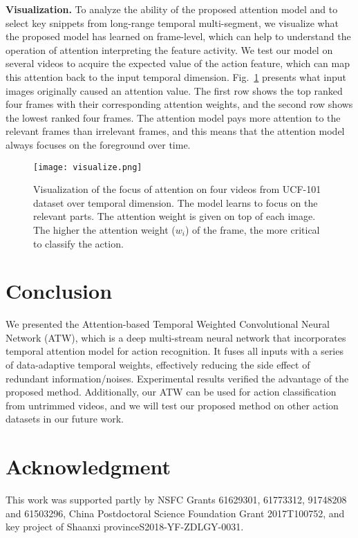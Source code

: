 \documentclass[runningheads,a4paper]{llncs}
\begin{document}
\noindent \textbf{Visualization.} To analyze the ability of the proposed attention model and to select key snippets from long-range temporal multi-segment, we visualize what the proposed model has learned on frame-level, which can help to understand the operation of attention interpreting the feature activity. We test our model on several videos to acquire the expected value of the action feature, which can map this attention back to the input temporal dimension. Fig.~\ref{fig:visualize} presents what input images originally caused an attention value. The first row shows the top ranked four frames with their corresponding attention weights, and the second row shows the lowest ranked four frames. The attention model pays more attention to the relevant frames than irrelevant frames, and this means that the attention model always focuses on the foreground over time.

\begin{figure}[t]
	\centering
	\texttt{[image: visualize.png]}

	\caption{Visualization of the focus of attention on four videos from
		UCF-101 dataset over temporal dimension. The model learns to focus on the relevant parts.
		The attention weight is given on top of each image. The higher the attention weight ($w_i$) of the frame,
		the more critical to classify the action.}
	\label{fig:visualize}
	\vspace{-0.05in}
\end{figure}
\section{Conclusion}

We presented the Attention-based Temporal Weighted Convolutional Neural Network (ATW), which is a deep multi-stream neural network that incorporates temporal attention model for action recognition. It fuses all inputs with a series of data-adaptive temporal weights, effectively reducing the side effect of redundant information/noises. Experimental results verified the advantage of the proposed method. Additionally, our ATW can be used for action classification from untrimmed videos, and we will test our proposed method on other action datasets in our future work.


\section*{Acknowledgment}
This work was supported partly by NSFC Grants 61629301, 61773312, 91748208 and 61503296, China Postdoctoral Science Foundation Grant 2017T100752, and key project of Shaanxi provinceS2018-YF-ZDLGY-0031.
\end{document}
